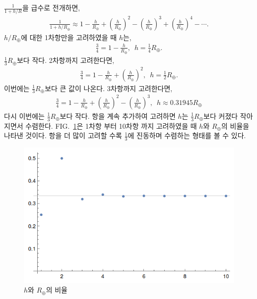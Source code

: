\documentclass[floatfix,nofootinbib,superscriptaddress,fleqn]{revtex4-2}
\begin{document}
$\frac{1}{1+h/R}$을 급수로 전개하면,
\begin{align}
    \frac{1}{1+h/R_\oplus} \approx
    1-\frac{h}{R_\oplus}+\left(\frac{h}{R_\oplus}\right)^2
    -\left(\frac{h}{R_\oplus}\right)^3
    +\left(\frac{h}{R_\oplus}\right)^4-\cdots.
\end{align}
$h/R_\oplus$에 대한 1차항만을 고려하였을 때 $h$는,
\begin{align}
    \frac{3}{4}=1-\frac{h}{R_\oplus},\,\,\,
    h = \frac{1}{4}R_\oplus.
\end{align}
$\frac{1}{3}R_\oplus$보다 작다.
2차항까지 고려한다면,
\begin{align}
    \frac{3}{4}=1-\frac{h}{R_\oplus}
    +\left(\frac{h}{R_\oplus}\right)^2,\,\,\,
    h = \frac{1}{2}R_\oplus.
\end{align}
이번에는 $\frac{1}{3}R_\oplus$보다 큰 값이 나온다.
3차항까지 고려한다면,
\begin{align}
    \frac{3}{4}=1-\frac{h}{R_\oplus}
    +\left(\frac{h}{R_\oplus}\right)^2
    -\left(\frac{h}{R_\oplus}\right)^3 ,\,\,\,
    h \approx 0.31945 R_\oplus
\end{align}
다시 이번에는 $\frac{1}{3}R_\oplus$보다 작다. 항을 계속 추가하여 고려하면
$h$는 $\frac{1}{3}R_\oplus$보다 커졌다 작아지면서 수렴한다. FIG.~\ref{fig:1}은 
1차항 부터 10차항 까지 고려하였을 때 $h$와 $R_\oplus$의 비율을 나타낸 것이다.
항을 더 많이 고려할 수록 $\frac{1}{3}$에 진동하며 수렴하는 형태를 볼 수 있다.
\begin{figure}[htp]
    \centering
  \includegraphics[scale=0.5]{pic:1-1.png}
    \caption{$h$와 $R_\oplus$의 비율}
    \label{fig:1}
  \end{figure}
\vspace{1.cm}
\end{document}
